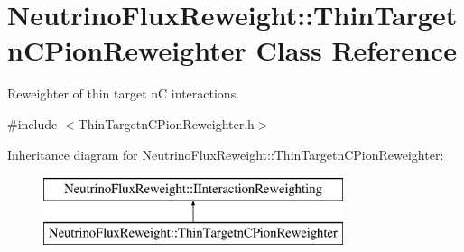 \hypertarget{class_neutrino_flux_reweight_1_1_thin_targetn_c_pion_reweighter}{\section{Neutrino\-Flux\-Reweight\-:\-:Thin\-Targetn\-C\-Pion\-Reweighter Class Reference}
\label{class_neutrino_flux_reweight_1_1_thin_targetn_c_pion_reweighter}
}


Reweighter of thin target n\-C interactions.  




{\ttfamily \#include $<$Thin\-Targetn\-C\-Pion\-Reweighter.\-h$>$}

Inheritance diagram for Neutrino\-Flux\-Reweight\-:\-:Thin\-Targetn\-C\-Pion\-Reweighter\-:\begin{figure}[H]
\begin{center}
\leavevmode
\includegraphics[height=2.000000cm]{class_neutrino_flux_reweight_1_1_thin_targetn_c_pion_reweighter}
\end{center}
\end{figure}
